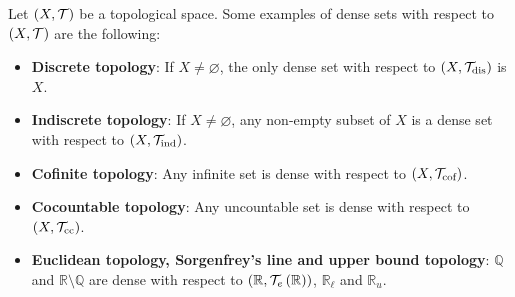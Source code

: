 \begin{example}
  Let $\left(X,\mathcal{T}\right)$ be a topological space. Some examples of dense sets with respect to $\left(X,\mathcal{T}\right)$ are the following:

  \begin{itemize}
    \item \textbf{Discrete topology}: If $X\neq\varnothing$, the only dense set with respect to $\left(X,\mathcal{T}_{\text{dis}}\right)$ is $X$.
    \item \textbf{Indiscrete topology}: If $X\neq\varnothing$, any non-empty subset of $X$ is a dense set with respect to $\left(X,\mathcal{T}_{\text{ind}}\right)$.
    \item \textbf{Cofinite topology}: Any infinite set is dense with respect to $\left(X,\mathcal{T}_{\text{cof}}\right)$.
    \item \textbf{Cocountable topology}: Any uncountable set is dense with respect to $\left(X,\mathcal{T}_{\text{cc}}\right)$.
    \item \textbf{Euclidean topology, Sorgenfrey's line and upper bound topology}: $\mathbb{Q}$ and $\mathbb{R}\setminus\mathbb{Q}$ are dense with respect to $\left(\mathbb{R},\mathcal{T}_e\left(\mathbb{R}\right)\right)$, $\mathbb{R}_{\ell}$ and $\mathbb{R}_u$.
  \end{itemize}
\end{example}

